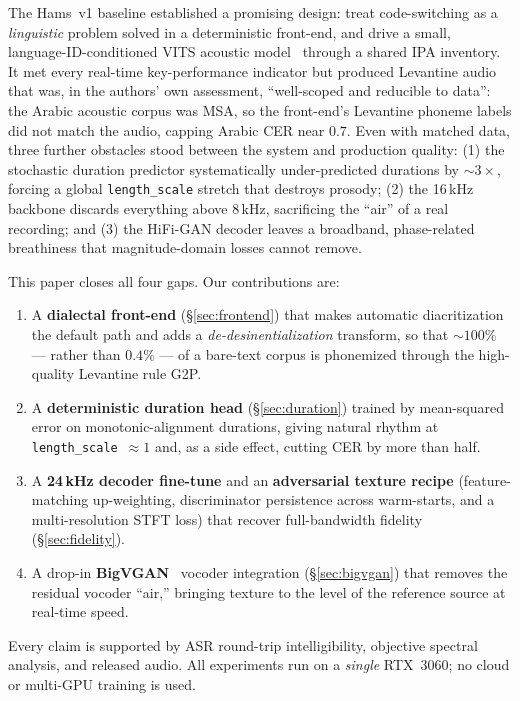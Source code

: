 \documentclass[10pt,twocolumn]{article}
\begin{document}
The Hams~v1 baseline established a promising design: treat code-switching as a
\emph{linguistic} problem solved in a deterministic front-end, and drive a small,
language-ID-conditioned VITS acoustic model~\cite{vits} through a shared IPA inventory. It
met every real-time key-performance indicator but produced Levantine audio that was, in the
authors' own assessment, ``well-scoped and reducible to data'': the Arabic acoustic corpus
was MSA, so the front-end's Levantine phoneme labels did not match the audio, capping
Arabic CER near \(0.7\). Even with matched data, three further obstacles stood between the
system and production quality: (1) the stochastic duration predictor systematically
under-predicted durations by \(\sim\!3\times\), forcing a global \texttt{length\_scale}
stretch that destroys prosody; (2) the 16\,kHz backbone discards everything above 8\,kHz,
sacrificing the ``air'' of a real recording; and (3) the HiFi-GAN decoder leaves a
broadband, phase-related breathiness that magnitude-domain losses cannot remove.

This paper closes all four gaps. Our contributions are:
\begin{enumerate}
\item A \textbf{dialectal front-end} (\S\ref{sec:frontend}) that makes automatic
diacritization the default path and adds a \emph{de-desinentialization} transform, so that
\(\sim\!100\%\) --- rather than \(0.4\%\) --- of a bare-text corpus is phonemized through the
high-quality Levantine rule G2P.
\item A \textbf{deterministic duration head} (\S\ref{sec:duration}) trained by
mean-squared error on monotonic-alignment durations, giving natural rhythm at
\texttt{length\_scale}~\(\approx\!1\) and, as a side effect, cutting CER by more than half.
\item A \textbf{24\,kHz decoder fine-tune} and an \textbf{adversarial texture recipe}
(feature-matching up-weighting, discriminator persistence across warm-starts, and a
multi-resolution STFT loss) that recover full-bandwidth fidelity (\S\ref{sec:fidelity}).
\item A drop-in \textbf{BigVGAN}~\cite{bigvgan} vocoder integration (\S\ref{sec:bigvgan})
that removes the residual vocoder ``air,'' bringing texture to the level of the reference
source at real-time speed.
\end{enumerate}
Every claim is supported by ASR round-trip intelligibility, objective spectral analysis, and
released audio. All experiments run on a \emph{single} RTX~3060; no cloud or multi-GPU
training is used.
\end{document}
